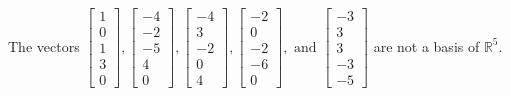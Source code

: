\begin{exercise}
\begin{exerciseStatement}
  \end{exerciseStatement}
  \begin{exerciseAnswer}
   The vectors \(\left[\begin{array}{r}
1 \\
0 \\
1 \\
3 \\
0
\end{array}\right] , \left[\begin{array}{r}
-4 \\
-2 \\
-5 \\
4 \\
0
\end{array}\right] , \left[\begin{array}{r}
-4 \\
3 \\
-2 \\
0 \\
4
\end{array}\right] , \left[\begin{array}{r}
-2 \\
0 \\
-2 \\
-6 \\
0
\end{array}\right] , \text{ and } \left[\begin{array}{r}
-3 \\
3 \\
3 \\
-3 \\
-5
\end{array}\right]\) 
  	 are not  a basis of \(\mathbb{R}^5\).
  


  \end{exerciseAnswer}
\end{exercise}